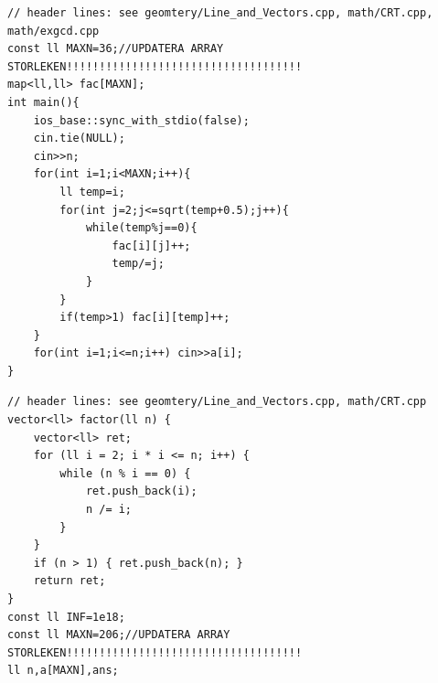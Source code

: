 
\begin{lstlisting}[breaklines=true]
// header lines: see geomtery/Line_and_Vectors.cpp, math/CRT.cpp, math/exgcd.cpp
const ll MAXN=36;//UPDATERA ARRAY STORLEKEN!!!!!!!!!!!!!!!!!!!!!!!!!!!!!!!!!!!!
map<ll,ll> fac[MAXN];
int main(){
    ios_base::sync_with_stdio(false);
    cin.tie(NULL);
    cin>>n;
    for(int i=1;i<MAXN;i++){
        ll temp=i;
        for(int j=2;j<=sqrt(temp+0.5);j++){
            while(temp%j==0){
                fac[i][j]++;
                temp/=j;
            }
        }
        if(temp>1) fac[i][temp]++;
    }
    for(int i=1;i<=n;i++) cin>>a[i];
}
\end{lstlisting}


\begin{lstlisting}[breaklines=true]
// header lines: see geomtery/Line_and_Vectors.cpp, math/CRT.cpp
vector<ll> factor(ll n) {
	vector<ll> ret;
	for (ll i = 2; i * i <= n; i++) {
		while (n % i == 0) {
			ret.push_back(i);
			n /= i;
		}
	}
	if (n > 1) { ret.push_back(n); }
	return ret;
}
const ll INF=1e18;
const ll MAXN=206;//UPDATERA ARRAY STORLEKEN!!!!!!!!!!!!!!!!!!!!!!!!!!!!!!!!!!!!
ll n,a[MAXN],ans;
\end{lstlisting}


